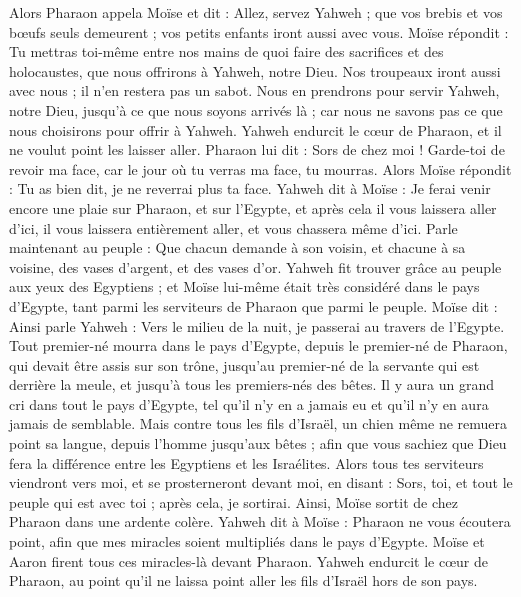 \begin{multicols}{2}
Alors Pharaon appela Moïse et dit : Allez, servez Yahweh ; que vos brebis et vos bœufs seuls demeurent ; vos petits enfants iront aussi avec vous.
Moïse répondit : Tu mettras toi-même entre nos mains de quoi faire des sacrifices et des holocaustes, que nous offrirons à Yahweh, notre Dieu.
Nos troupeaux iront aussi avec nous ; il n'en restera pas un sabot. Nous en prendrons pour servir Yahweh, notre Dieu, jusqu’à ce que nous soyons arrivés là ; car nous ne savons pas ce que nous choisirons pour offrir à Yahweh.
Yahweh endurcit le cœur de Pharaon, et il ne voulut point les laisser aller.
Pharaon lui dit : Sors de chez moi ! Garde-toi de revoir ma face, car le jour où tu verras ma face, tu mourras.
Alors Moïse répondit : Tu as bien dit, je ne reverrai plus ta face.
\VerseOne{}Yahweh dit à Moïse : Je ferai venir encore une plaie sur Pharaon, et sur l'Egypte, et après cela il vous laissera aller d'ici, il vous laissera entièrement aller, et vous chassera même d’ici.
Parle maintenant au peuple : Que chacun demande à son voisin, et chacune à sa voisine, des vases d'argent, et des vases d'or.
Yahweh fit trouver grâce au peuple aux yeux des Egyptiens ; et Moïse lui-même était très considéré dans le pays d'Egypte, tant parmi les serviteurs de Pharaon que parmi le peuple.
Moïse dit : Ainsi parle Yahweh : Vers le milieu de la nuit, je passerai au travers de l'Egypte.
Tout premier-né mourra dans le pays d'Egypte, depuis le premier-né de Pharaon, qui devait être assis sur son trône, jusqu'au premier-né de la servante qui est derrière la meule, et jusqu’à tous les premiers-nés des bêtes.
Il y aura un grand cri dans tout le pays d'Egypte, tel qu'il n'y en a jamais eu et qu’il n'y en aura jamais de semblable.
Mais contre tous les fils d'Israël, un chien même ne remuera point sa langue, depuis l'homme jusqu’aux bêtes ; afin que vous sachiez que Dieu fera la différence entre les Egyptiens et les Israélites.
Alors tous tes serviteurs viendront vers moi, et se prosterneront devant moi, en disant : Sors, toi, et tout le peuple qui est avec toi ; après cela, je sortirai. Ainsi, Moïse sortit de chez Pharaon dans une ardente colère.
Yahweh dit à Moïse : Pharaon ne vous écoutera point, afin que mes miracles soient multipliés dans le pays d'Egypte.
Moïse et Aaron firent tous ces miracles-là devant Pharaon. Yahweh endurcit le cœur de Pharaon, au point qu'il ne laissa point aller les fils d'Israël hors de son pays.

\end{multicols}
